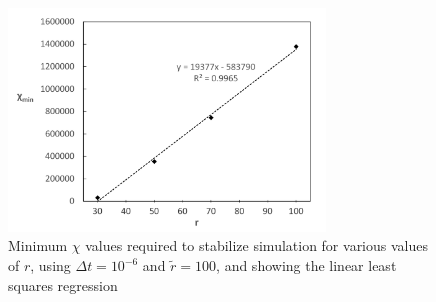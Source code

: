 \begin{figure}[!tb]
\centering
\includegraphics[width=0.75\textwidth]{figures/min_chi_dt6_r100.pdf}
\caption{Minimum $\chi$ values required to stabilize simulation for various values of $r$, using $\Delta t=10^{-6}$ and $\tilde{r}=100$, and showing the linear least squares regression}
\label{fig:min_chi_dt6_r100}
\end{figure}
